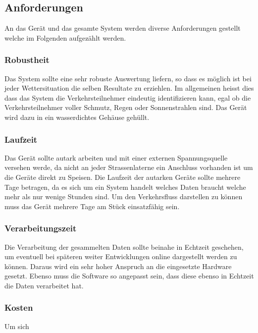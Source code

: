 \subsection{Anforderungen}
An das Ger\"at und das gesamte System werden diverse Anforderungen gestellt welche im Folgenden aufgez\"ahlt werden.
\subsubsection{Robustheit}
Das System sollte eine sehr robuste Auswertung liefern, so dass es m\"oglich ist bei jeder Wettersituation die selben Resultate zu erziehlen. Im allgemeinen heisst dies dass das System die Verkehrsteilnehmer eindeutig identifizieren kann, egal ob die Verkehrsteilnehmer voller Schmutz, Regen oder Sonnenstrahlen sind. Das Ger\"at wird dazu in ein wasserdichtes Gehäuse gehüllt. 
\subsubsection{Laufzeit}
Das Ger\"at sollte autark arbeiten und mit einer externen Spannungsquelle versehen werde, da nicht an jeder Strassenlaterne ein Anschluss vorhanden ist um die Ger\"ate direkt zu Speisen. Die Laufzeit der autarken Ger\"ate sollte mehrere Tage betragen, da es sich um ein System handelt welches Daten braucht welche mehr als nur wenige Stunden sind. Um den Verkehrsfluss darstellen zu k\"onnen muss das Ger\"at mehrere Tage am St\"uck einsatzf\"ahig sein.
\subsubsection{Verarbeitungszeit}
Die Verarbeitung der gesammelten Daten sollte beinahe in Echtzeit geschehen, um eventuell bei sp\"ateren weiter Entwicklungen online dargestellt werden zu k\"onnen. Daraus wird ein sehr hoher Anspruch an die eingesetzte Hardware gesetzt. Ebenso muss die Software so angepasst sein, dass diese ebenso in Echtzeit die Daten verarbeitet hat.
\subsubsection{Kosten}
Um sich 